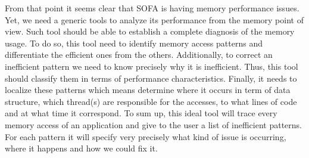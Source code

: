 From that point it seems clear that \gls{SOFA} is having memory performance issues.
Yet, we need a generic tools to analyze its performance from the memory point of view.
Such tool should be able to establish a complete diagnosis of the memory usage.
To do so, this tool need to identify memory access patterns and differentiate the efficient ones from the others.
Additionally, to correct an inefficient pattern we need to know precisely why it is inefficient.
Thus, this tool should classify them in terms of performance characteristics.
Finally, it needs to localize these patterns which means determine where it occurs in term of data structure, which thread(s) are responsible for the accesses, to what lines of code and at what time it correspond.
To sum up, this ideal tool will trace every memory access of an application and give to the user a list of inefficient patterns.
For each pattern it will specify very precisely what kind of issue is occurring, where it happens and how we could fix it.


